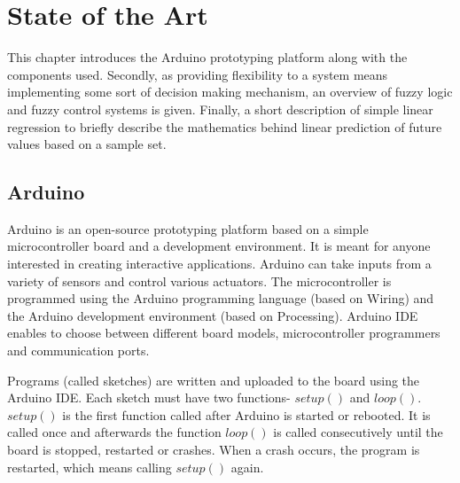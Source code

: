 

\chapter{State of the Art} %

This chapter introduces the Arduino prototyping platform along with the components used. Secondly, as providing flexibility to a system means implementing some sort of decision making mechanism, an overview of fuzzy logic and fuzzy control systems is given. Finally, a short description of simple linear regression to briefly describe the mathematics behind linear prediction of future values based on a sample set.


\ifpdf
    \graphicspath{{X/figures/PNG/}{X/figures/PDF/}{X/figures/}}
\else
    \graphicspath{{X/figures/EPS/}{X/figures/}}
\fi


\section{Arduino}

Arduino \cite{arduinoHome} is an open-source prototyping platform based on a simple microcontroller board and a development environment. It is meant for anyone interested in creating interactive applications. Arduino can take inputs from a variety of sensors and control various actuators. The microcontroller is programmed using the Arduino programming language (based on Wiring) and the Arduino development environment (based on Processing). Arduino IDE enables to choose between different board models, microcontroller programmers and communication ports. 

Programs (called sketches) are written and uploaded to the board using the Arduino IDE. Each sketch must have two functions- $setup()$ and $loop()$. $setup()$ is the first function called after Arduino is started or rebooted. It is called once and afterwards the function $loop()$ is called consecutively until the board is stopped, restarted or crashes. When a crash occurs, the program is restarted, which means calling $setup()$ again. 

